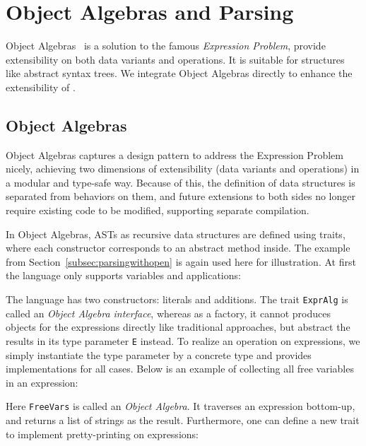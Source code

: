 \section{Object Algebras and Parsing}\label{sec:algebrasandparsing}

Object Algebras~\cite{Oliveira2012} is a solution to the famous \textit{Expression Problem}, provide extensibility on
both data variants and operations. It is suitable for structures like abstract syntax trees. We integrate Object Algebras directly to enhance the extensibility of \name.

\subsection{Object Algebras}\label{subsec:objectalgebras}
Object Algebras captures a design pattern to address the Expression Problem nicely,
achieving two dimensions of extensibility (data variants and operations) in a modular and type-safe way.
Because of this, the definition of data structures is separated from behaviors on them, and future extensions
to both sides no longer require existing code to be modified, supporting separate compilation.

In Object Algebras, ASTs as recursive data structures are defined using traits, where each constructor corresponds
to an abstract method inside. The example from Section~\ref{subsec:parsingwithopen} is again used here for illustration.
At first the language only supports variables and applications:


The language has two constructors: literals and additions. The trait \lstinline{ExprAlg} is called an \textit{Object Algebra interface},
whereas as a factory, it cannot produces objects for the expressions directly like traditional approaches, but abstract the results in its
type parameter \lstinline{E} instead. To realize an operation on expressions, we simply instantiate the type parameter by a concrete type and
provides implementations for all cases. Below is an example of collecting all free variables in an expression:


Here \lstinline{FreeVars} is called an \textit{Object Algebra}. It traverses an expression bottom-up, and returns a list of strings as the result.
Furthermore, one can define a new trait to implement pretty-printing on expressions:

